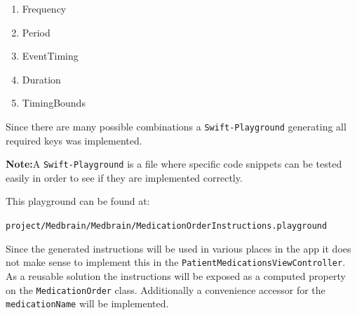 \documentclass{article}
\begin{document}
\begin{enumerate}
\def\labelenumi{\arabic{enumi}.}

\item
  Frequency
\item
  Period
\item
  EventTiming
\item
  Duration
\item
  TimingBounds
\end{enumerate}

Since there are many possible combinations a \texttt{Swift-Playground} generating all required keys was implemented.

\textbf{Note:}A \texttt{Swift-Playground} is a file where specific code
snippets can be tested easily in order to see if they are implemented
correctly.

This playground can be found at:

\texttt{project/Medbrain/Medbrain/MedicationOrderInstructions.playground}

Since the generated instructions will be used in various places in the
app it does not make sense to implement this in the
\texttt{PatientMedicationsViewController}.
As a reusable solution the instructions will be exposed as a computed
property on the \texttt{MedicationOrder} class.
Additionally a convenience accessor for the \texttt{medicationName} will
be implemented.
\end{document}
